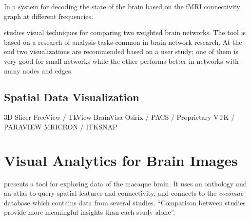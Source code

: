 In \autocite{richiardi_decoding_2011} a system for decoding the state of the brain based on the fMRI connectivity graph at different frequencies.

\autocite{alper_weighted_2013} studies visual techniques for comparing two weighted brain networks. The tool is based on a research of analysis tasks common in brain network research. At the end two visualizations are recommended based on a user study; one of them is very good for small networks while the other performs better in networks with many nodes and edges.

\subsection{Spatial Data Visualization}

3D Slicer
FreeView / TkView
BrainVisa
Osirix / PACS / Proprietary
VTK / PARAVIEW
MRICRON / ITKSNAP









\section{Visual Analytics for Brain Images}

\autocite{bezgin_matching_2009} presents a tool for exploring data of the macaque brain. It uses an onthology and an atlas to query spatial features and connectivity, and connects to the \emph{cocomac} database which contains data from several studies. ``Comparison between studies provide more meaningful insights than each study alone''.


